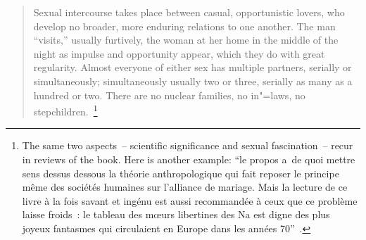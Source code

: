 \largerpage[-2]
\begin{quotation}
	Sexual intercourse takes place between casual, opportunistic lovers, who develop no broader, more
	enduring relations to one another. The man “visits,” usually furtively, the woman at her home in
	the middle of the night as impulse and opportunity appear, which they do with great
	regularity. Almost everyone of either sex has multiple partners, serially or simultaneously;
	simultaneously usually two or three, serially as many as a \hfill hundred
	\newpage\noindent
	or two. There are no nuclear
	families, no in"=laws, no stepchildren.~\citep{geertz2001}\footnote{The same two aspects~--
		scientific significance and sexual fascination~-- recur in reviews of the book. Here is another
		example: “le propos a~de quoi mettre sens dessus dessous la théorie anthropologique qui fait
		reposer le principe même des sociétés humaines sur l'alliance de mariage. Mais la lecture de ce
		livre à la fois savant et ingénu est aussi recommandée à ceux que ce problème laisse froids~: le
		tableau des mœurs libertines des Na est digne des plus joyeux fantasmes qui circulaient en
		Europe dans les années 70”~\citep{journet1998}.}
\end{quotation}

